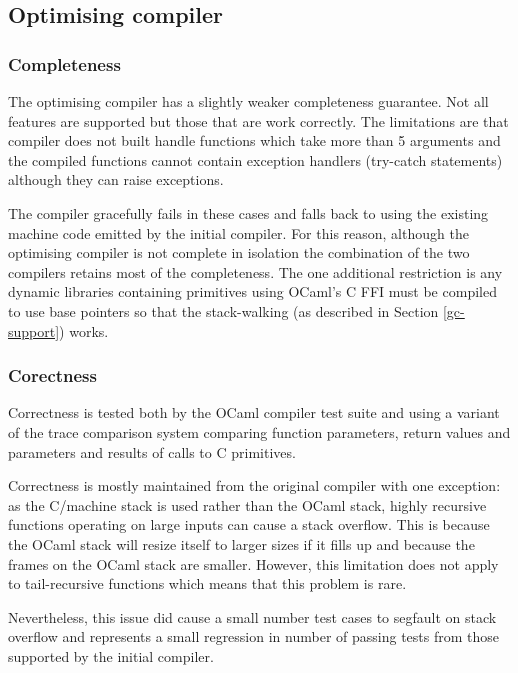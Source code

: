 \subsection{Optimising compiler} \label{eval-opt-comp-qual}

\subsubsection{Completeness}

The optimising compiler has a slightly weaker completeness guarantee. Not all features are
supported
but those that are work correctly. The limitations are that compiler does not built handle
functions which take more than 5 arguments and the compiled functions cannot contain exception
handlers (try-catch statements) although they can raise exceptions.

The compiler gracefully fails in these cases and falls back to using the existing machine code
emitted by the initial compiler. For this reason, although the optimising compiler is not complete
in isolation the combination of the two compilers retains most of the completeness. The one
additional restriction is any dynamic libraries containing primitives using OCaml's C FFI must be
compiled to use base pointers so that the stack-walking (as described in Section \ref{gc-support})
works.

\subsubsection{Corectness}

Correctness is tested both by the OCaml compiler test suite and using a variant of the trace
comparison system comparing function parameters, return values and parameters and results of calls
to C primitives.

Correctness is mostly maintained from the original compiler with one exception: as the C/machine
stack is used rather than the OCaml stack, highly recursive functions operating on large inputs can
cause a stack overflow. This is because the OCaml stack will resize itself to larger sizes if it
fills up and because the frames on the OCaml stack are smaller.  However, this limitation does not
apply to tail-recursive functions which means that this problem is rare.

Nevertheless, this issue did cause a small number test cases to segfault on stack overflow and
represents a small regression in number of passing tests from those supported by the initial
compiler.

